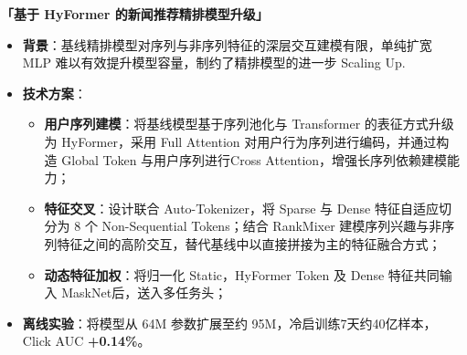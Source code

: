 \documentclass{resume}
\newcommand{\projectheading}[2]{%
  \par\addvspace{0.6em}%
  \noindent\textbf{\ifthenelse{\isempty{#1}}{项目}{#1}「#2」}\par\nopagebreak\vspace{0.2em}%
}
\newenvironment{projectbody}{%
  \begin{itemize}[label={}, leftmargin=0pt, labelsep=0pt,
    topsep=0pt, partopsep=0pt, parsep=0pt, itemsep=0pt]%
}{%
  \end{itemize}%
}
\begin{document}
\projectheading{项目一}{基于 HyFormer 的新闻推荐精排模型升级}
\begin{projectbody}

\item \textbf{背景}：基线精排模型对序列与非序列特征的深层交互建模有限，单纯扩宽 MLP 难以有效提升模型容量，制约了精排模型的进一步 Scaling Up.

\item \textbf{技术方案}：
\begin{itemize}[label=\textbullet, labelsep=0.5em]
  \item \textbf{用户序列建模}：将基线模型基于序列池化与 Transformer 的表征方式升级为 HyFormer，采用 Full Attention 对用户行为序列进行编码，并通过构造 Global Token 与用户序列进行Cross Attention，增强长序列依赖建模能力；
  
  \item \textbf{特征交叉}：设计联合 Auto-Tokenizer，将 Sparse 与 Dense 特征自适应切分为 8 个 Non-Sequential Tokens；结合 RankMixer 建模序列兴趣与非序列特征之间的高阶交互，替代基线中以直接拼接为主的特征融合方式；
  
  \item \textbf{动态特征加权}：将归一化 Static，HyFormer Token 及 Dense 特征共同输入 MaskNet后，送入多任务头；
\end{itemize}
\item \textbf{离线实验}：将模型从 64M 参数扩展至约 95M，冷启训练7天约40亿样本，Click AUC \textbf{+0.14\%}。
\end{projectbody}
\end{document}
